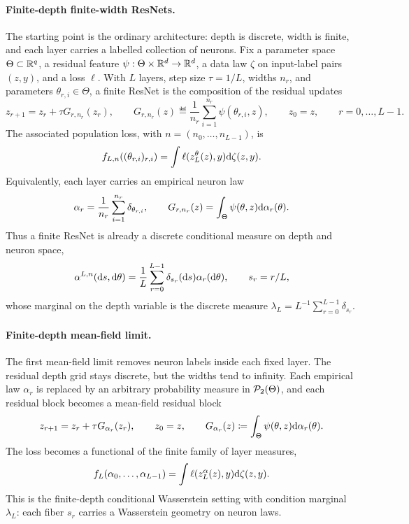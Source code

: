 \paragraph{Finite-depth finite-width ResNets.}
The starting point is the ordinary architecture: depth is discrete, width is finite, and each layer carries a labelled collection of neurons. Fix a parameter space $\Theta\subset\mathbb{R}^q$, a residual feature $\psi:\Theta\times\mathbb{R}^d\to\mathbb{R}^d$, a data law $\zeta$ on input-label pairs $(z,y)$, and a loss $\ell$. With $L$ layers, step size $\tau=1/L$, widths $n_r$, and parameters $\theta_{r,i}\in\Theta$, a finite ResNet is the composition of the residual updates
\begin{equation}\label{eq-finite-resnet}
	z_{r+1}
	=
	z_r+\tau G_{r,n_r}(z_r),
	\qquad
	G_{r,n_r}(z)
	\eqdef
	\frac1{n_r}\sum_{i=1}^{n_r}\psi(\theta_{r,i},z),
	\qquad
	z_0=z,\qquad r=0,\ldots,L-1.
\end{equation}
The associated population loss, with $n=(n_0,\ldots,n_{L-1})$, is
\[
	f_{L,n}((\theta_{r,i})_{r,i})
	=
	\int \ell(z_L^{\theta}(z),y)\mathrm{d}\zeta(z,y).
\]
Equivalently, each layer carries an empirical neuron law
\[
	\alpha_r
	=
	\frac1{n_r}\sum_{i=1}^{n_r}\delta_{\theta_{r,i}},
	\qquad
	G_{r,n_r}(z)
	=
	\int_\Theta\psi(\theta,z)\mathrm{d}\alpha_r(\theta).
\]
Thus a finite ResNet is already a discrete conditional measure on depth and neuron space,
\[
	\alpha^{L,n}(\mathrm{d} s,\mathrm{d}\theta)
	=
	\frac1L\sum_{r=0}^{L-1}\delta_{s_r}(\mathrm{d} s)\alpha_r(\mathrm{d}\theta),
	\qquad
	s_r=r/L,
\]
whose marginal on the depth variable is the discrete measure $\lambda_L=L^{-1}\sum_{r=0}^{L-1}\delta_{s_r}$.

\paragraph{Finite-depth mean-field limit.}
The first mean-field limit removes neuron labels inside each fixed layer. The residual depth grid stays discrete, but the widths tend to infinity. Each empirical law $\alpha_r$ is replaced by an arbitrary probability measure in $\mathcal{P}_2(\Theta)$, and each residual block becomes a mean-field residual block
\[
	z_{r+1}
	=
	z_r+\tau G_{\alpha_r}(z_r),
	\qquad z_0=z,
	\qquad
	G_{\alpha_r}(z)
	\coloneqq
	\int_\Theta\psi(\theta,z)\mathrm{d}\alpha_r(\theta).
\]
The loss becomes a functional of the finite family of layer measures,
\[
	f_L(\alpha_0,\ldots,\alpha_{L-1})
	=
	\int \ell(z_L^\alpha(z),y)\mathrm{d}\zeta(z,y).
\]
This is the finite-depth conditional Wasserstein setting with condition marginal $\lambda_L$: each fiber $s_r$ carries a Wasserstein geometry on neuron laws.

